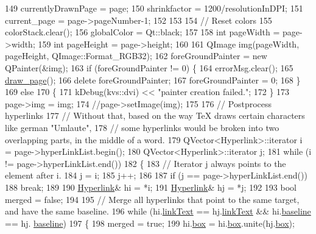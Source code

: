 \begin{DoxyCode}
149   currentlyDrawnPage     = page;
150   shrinkfactor           = 1200/resolutionInDPI;
151   current\_page           = page->pageNumber-1;
152 
153 
154   \textcolor{comment}{// Reset colors}
155   colorStack.clear();
156   globalColor = Qt::black;
157 
158   \textcolor{keywordtype}{int} pageWidth = page->width;
159   \textcolor{keywordtype}{int} pageHeight = page->height;
160  
161   QImage img(pageWidth, pageHeight, QImage::Format\_RGB32);
162   foreGroundPainter = \textcolor{keyword}{new} QPainter(&img);
163   \textcolor{keywordflow}{if} (foreGroundPainter != 0) \{
164     errorMsg.clear();
165     \hyperlink{classdviRenderer_a88550ffd9961878d36b244b21edb7647}{draw\_page}();
166     \textcolor{keyword}{delete} foreGroundPainter;
167     foreGroundPainter = 0;
168   \}
169   \textcolor{keywordflow}{else}
170   \{
171     kDebug(kvs::dvi) << \textcolor{stringliteral}{"painter creation failed."};
172   \} 
173   page->img = img;
174 \textcolor{comment}{//page->setImage(img);}
175  
176   \textcolor{comment}{// Postprocess hyperlinks}
177   \textcolor{comment}{// Without that, based on the way TeX draws certain characters like german "Umlaute",}
178   \textcolor{comment}{// some hyperlinks would be broken into two overlapping parts, in the middle of a word.}
179   QVector<Hyperlink>::iterator i = page->hyperLinkList.begin();
180   QVector<Hyperlink>::iterator j;
181   \textcolor{keywordflow}{while} (i != page->hyperLinkList.end())
182   \{
183     \textcolor{comment}{// Iterator j always points to the element after i.}
184     j = i;
185     j++;
186 
187     \textcolor{keywordflow}{if} (j == page->hyperLinkList.end())
188       \textcolor{keywordflow}{break};
189 
190     \hyperlink{classHyperlink}{Hyperlink}& hi = *i;
191     \hyperlink{classHyperlink}{Hyperlink}& hj = *j;
192 
193     \textcolor{keywordtype}{bool} merged = \textcolor{keyword}{false};
194 
195     \textcolor{comment}{// Merge all hyperlinks that point to the same target, and have the same baseline.}
196     \textcolor{keywordflow}{while} (hi.\hyperlink{classHyperlink_a9aa732893dfb8f1c253132dca07cb052}{linkText} == hj.\hyperlink{classHyperlink_a9aa732893dfb8f1c253132dca07cb052}{linkText} && hi.\hyperlink{classHyperlink_aec2a7167f48623f38d3c628e0ebb298f}{baseline} == hj.
      \hyperlink{classHyperlink_aec2a7167f48623f38d3c628e0ebb298f}{baseline})
197     \{
198       merged = \textcolor{keyword}{true};
199       hi.\hyperlink{classHyperlink_ad7a3e8de8ad043dd8bbfb65eb963c72d}{box} = hi.\hyperlink{classHyperlink_ad7a3e8de8ad043dd8bbfb65eb963c72d}{box}.unite(hj.\hyperlink{classHyperlink_ad7a3e8de8ad043dd8bbfb65eb963c72d}{box});

\end{DoxyCode}
